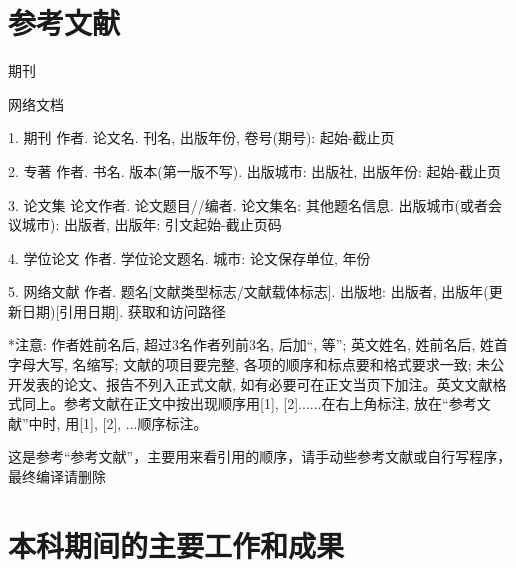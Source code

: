 \documentclass[UTF8,openany,AutoFakeBold,AutoFakeSlant,cs4size]{ctexbook}
\begin{document}
\small
\linespread{1}\selectfont
\chapter*{参考文献}
\noindent
\begin{enumerate}[{[1]}]
\small
	\item 期刊
	\item 网络文档
\end{enumerate}

1.	期刊  作者. 论文名. 刊名, 出版年份, 卷号(期号): 起始-截止页

2.	专著  作者. 书名. 版本(第一版不写). 出版城市: 出版社, 出版年份: 起始-截止页

3.	论文集  论文作者. 论文题目//编者. 论文集名: 其他题名信息. 出版城市(或者会议城市): 出版者, 出版年: 引文起始-截止页码

4.	学位论文  作者. 学位论文题名. 城市: 论文保存单位, 年份

5.	网络文献  作者. 题名[文献类型标志/文献载体标志]. 出版地: 出版者, 出版年(更新日期)[引用日期]. 获取和访问路径

*注意: 作者姓前名后, 超过3名作者列前3名, 后加“, 等”; 英文姓名, 姓前名后, 姓首字母大写, 名缩写; 文献的项目要完整, 各项的顺序和标点要和格式要求一致; 未公开发表的论文、报告不列入正式文献, 如有必要可在正文当页下加注。英文文献格式同上。参考文献在正文中按出现顺序用[1], [2]......在右上角标注, 放在“参考文献”中时, 用[1], [2], ...顺序标注。



{
	\fancyhf{}
	\fancyfoot[CO,CE]{~\thepage~}
	\renewcommand{\headrulewidth}{0.7pt}
	\renewcommand{\footrulewidth}{0pt}
}
\fancyhf{}
\fancyfoot[CO,CE]{~\thepage~}
\renewcommand{\headrulewidth}{0.7pt}
\renewcommand{\footrulewidth}{0pt}








这是参考“参考文献”，主要用来看引用的顺序，请手动些参考文献或自行写程序，最终编译请删除
\clearpage





\linespread{1}\selectfont
\normalsize
\chapter*{本科期间的主要工作和成果}
\end{document}
